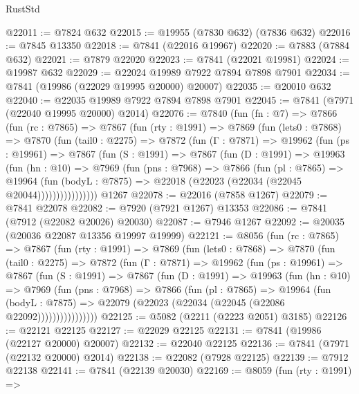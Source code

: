 \begin{lexlean}{RustStd}
\begin{coremodule}
@22011 := @7824 @632
@22015 := @19955 (@7830 @632) (@7836 @632)
@22016 := @7845 @13350
@22018 := @7841 (@22016 @19967)
@22020 := @7883 (@7884 @632)
@22021 := @7879 @22020
@22023 := @7841 (@22021 @19981)
@22024 := @19987 @632
@22029 := @22024 @19989 @7922 @7894 @7898 @7901
@22034 := @7841 (@19986 (@22029 @19995 @20000) @20007)
@22035 := @20010 @632
@22040 := @22035 @19989 @7922 @7894 @7898 @7901
@22045 := @7841 (@7971 (@22040 @19995 @20000) @2014)
@22076 := @7840
    (fun (fn : @7) =>
    @7866
      (fun (rc : @7865) =>
      @7867
        (fun (rty : @1991) =>
        @7869
          (fun (lets0 : @7868) =>
          @7870
            (fun (tail0 : @2275) =>
            @7872
              (fun (Γ : @7871) =>
              @19962
                (fun (ps : @19961) =>
                @7867
                  (fun (S : @1991) =>
                  @7867
                    (fun (D : @1991) =>
                    @19963
                      (fun (hn : @10) =>
                      @7969
                        (fun (pns : @7968) =>
                        @7866
                          (fun (pl : @7865) =>
                          @19964
                            (fun (bodyL : @7875) =>
                            @22018 (@22023 (@22034 (@22045 @20044))))))))))))))))
    @1267
@22078 := @22016 (@7858 @1267)
@22079 := @7841 @22078
@22082 := @7920 (@7921 @1267) @13353
@22086 := @7841 (@7912 (@22082 @20026) @20030)
@22087 := @7946 @1267
@22092 := @20035 (@20036 @22087 @13356 @19997 @19999)
@22121 := @8056
    (fun (rc : @7865) =>
    @7867
      (fun (rty : @1991) =>
      @7869
        (fun (lets0 : @7868) =>
        @7870
          (fun (tail0 : @2275) =>
          @7872
            (fun (Γ : @7871) =>
            @19962
              (fun (ps : @19961) =>
              @7867
                (fun (S : @1991) =>
                @7867
                  (fun (D : @1991) =>
                  @19963
                    (fun (hn : @10) =>
                    @7969
                      (fun (pns : @7968) =>
                      @7866
                        (fun (pl : @7865) =>
                        @19964
                          (fun (bodyL : @7875) =>
                          @22079 (@22023 (@22034 (@22045 (@22086 @22092))))))))))))))))
@22125 := @5082 (@2211 (@2223 @2051) @3185)
@22126 := @22121 @22125
@22127 := @22029 @22125
@22131 := @7841 (@19986 (@22127 @20000) @20007)
@22132 := @22040 @22125
@22136 := @7841 (@7971 (@22132 @20000) @2014)
@22138 := @22082 (@7928 @22125)
@22139 := @7912 @22138
@22141 := @7841 (@22139 @20030)
@22169 := @8059
    (fun (rty : @1991) =>

\end{coremodule}
\end{lexlean}
